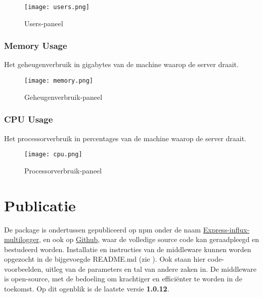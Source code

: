 \begin{figure}[h!]
	\centering
	\texttt{[image: users.png]}
	\caption{Users-paneel}
	\label{fig:users}
\end{figure}

\subsubsection{Memory Usage}
\label{sec:memory}
Het geheugenverbruik in gigabytes van de machine waarop de server draait.
\begin{figure}[h!]
	\centering
	\texttt{[image: memory.png]}
	\caption{Geheugenverbruik-paneel}
	\label{fig:mem}
\end{figure}

\subsubsection{CPU Usage}
\label{sec:cpu}
Het processorverbruik in percentages van de machine waarop de server draait.

\begin{figure}[h!]
	\centering
	\texttt{[image: cpu.png]}
	\caption{Processorverbruik-paneel}
	\label{fig:cpu}
\end{figure}

\section{Publicatie}
\label{sec:publication}

De package is ondertussen gepubliceerd op npm onder de naam \href{https://www.npmjs.com/package/express-influx-multilogger}{Express-influx-multilogger,} en ook op \href{https://github.com/LeunensMichiel/express-influx-multilogger}{Github}, waar de volledige source code kan geraadpleegd en bestudeerd worden. Installatie en instructies van de middleware kunnen worden opgezocht in de bijgevoegde README.md (zie ). Ook staan hier code-voorbeelden, uitleg van de parameters en tal van andere zaken in. De middleware is open-source, met de bedoeling om krachtiger en efficiënter te worden in de toekomst. Op dit ogenblik is de laatste versie \textbf{1.0.12}.
 